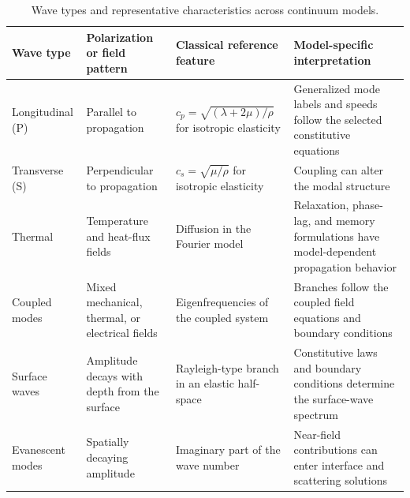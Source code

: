 \begin{table}[htbp]
\centering
\small
\caption{Wave types and representative characteristics across continuum models.}
\label{tab:T4-waves}
\begin{tabularx}{\textwidth}{@{}p{2.4cm}XXX@{}}
\toprule
\textbf{Wave type} & \textbf{Polarization or field pattern} & \textbf{Classical reference feature} & \textbf{Model-specific interpretation} \\
\midrule
Longitudinal (P) & Parallel to propagation & $c_p=\sqrt{(\lambda+2\mu)/\rho}$ for isotropic elasticity & Generalized mode labels and speeds follow the selected constitutive equations \\
Transverse (S) & Perpendicular to propagation & $c_s=\sqrt{\mu/\rho}$ for isotropic elasticity & Coupling can alter the modal structure \\
Thermal & Temperature and heat-flux fields & Diffusion in the Fourier model & Relaxation, phase-lag, and memory formulations have model-dependent propagation behavior \\
Coupled modes & Mixed mechanical, thermal, or electrical fields & Eigenfrequencies of the coupled system & Branches follow the coupled field equations and boundary conditions \\
Surface waves & Amplitude decays with depth from the surface & Rayleigh-type branch in an elastic half-space & Constitutive laws and boundary conditions determine the surface-wave spectrum \\
Evanescent modes & Spatially decaying amplitude & Imaginary part of the wave number & Near-field contributions can enter interface and scattering solutions \\
\bottomrule
\end{tabularx}
\par{}
\end{table}
